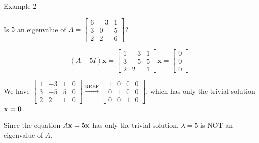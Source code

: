 \documentclass[xcolor=dvipsnames,aspectratio=169,t]{beamer}
\begin{document}
\begin{frame}{Example 2}
  \medskip

  Is $5$ an \alert{eigenvalue} of $A = \begin{bmatrix} 6 & -3 & 1 \\ 3 & 0 & 5 \\ 2 & 2 & 6 \end{bmatrix}$?
  \bigskip

  \pause
  \[ (A - 5I) \mathbf{x} = \begin{bmatrix} 1 & -3 & 1 \\ 3 & -5 & 5 \\ 2 & 2 & 1 \end{bmatrix}  \mathbf{x} =  \begin{bmatrix} 0 \\ 0 \\0 \end{bmatrix} \]

  We have $\begin{bmatrix} 1 & -3 & 1 & 0 \\ 3 & -5 & 5 & 0 \\ 2 & 2 & 1 & 0 \end{bmatrix}
  \xrightarrow{\text{RREF}} \begin{bmatrix} 1 &  0 & 0 & 0 \\ 0 & 1 & 0 & 0 \\ 0 & 0 & 1 & 0 \end{bmatrix}$, 
  \pause
  which has only the \alert{trivial solution} $\mathbf{x} = \mathbf{0}$.
  \bigskip

  Since the equation $A\mathbf{x}=5\mathbf{x}$ has only the trivial solution, $\lambda =5$ is \alert{NOT} an eigenvalue of $A$.
\end{frame}
\end{document}
